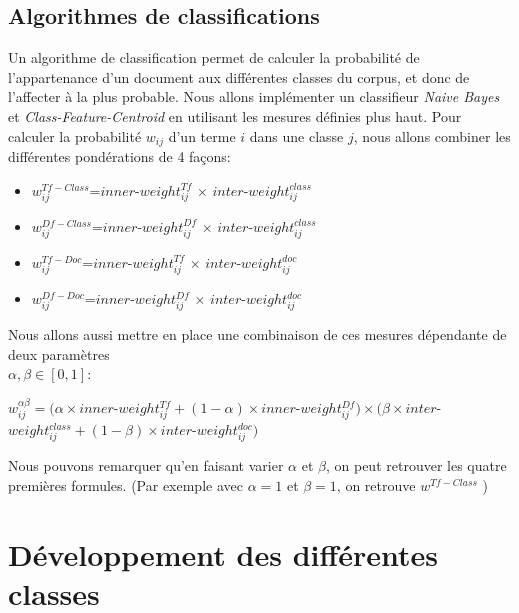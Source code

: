 \documentclass{article}
\begin{document}
\subsection{Algorithmes de classifications}
Un algorithme de classification permet de calculer la probabilité de l'appartenance d'un document aux différentes classes du corpus, et donc de l'affecter à la plus probable. Nous allons implémenter un classifieur \textit{Naive Bayes} et \textit{Class-Feature-Centroid}\cite{RNTIB} en utilisant les mesures définies plus haut. Pour calculer la probabilité $w_{ij}$ d'un terme $i$ dans une classe $j$, nous allons combiner les différentes pondérations de 4 façons:
\medskip
\begin{itemize}
\item $w_{ij}^{Tf-Class}$=$inner$-$weight_{ij}^{Tf}$ $\times$ $inter$-$weight_{ij}^{class}$
\item $w_{ij}^{Df-Class}$=$inner$-$weight_{ij}^{Df}$ $\times$ $inter$-$weight_{ij}^{class}$
\item $w_{ij}^{Tf-Doc}$=$inner$-$weight_{ij}^{Tf}$ $\times$ $inter$-$weight_{ij}^{doc}$
\item $w_{ij}^{Df-Doc}$=$inner$-$weight_{ij}^{Df}$ $\times$ $inter$-$weight_{ij}^{doc}$
\end{itemize}
\bigskip
Nous allons aussi mettre en place une combinaison de ces mesures dépendante de deux paramètres\\ $\alpha,\beta \in [0,1]$:
\begin{center}
 $w_{ij}^{ \alpha \beta}=(\alpha \times inner$-$weight_{ij}^{Tf} + (1-\alpha)\times inner$-$weight_{ij}^{Df} )\times(\beta \times inter$-$weight_{ij}^{class} + (1-\beta) \times inter$-$weight_{ij}^{doc} )$
\end{center}

Nous pouvons remarquer qu'en faisant varier $\alpha$ et $\beta$, on peut retrouver les quatre premières formules. (Par exemple avec $\alpha=1$ et $\beta=1$, on retrouve  $w^{Tf-Class}$ )



\section{Développement des différentes classes}\label{sec:classes}
\end{document}
